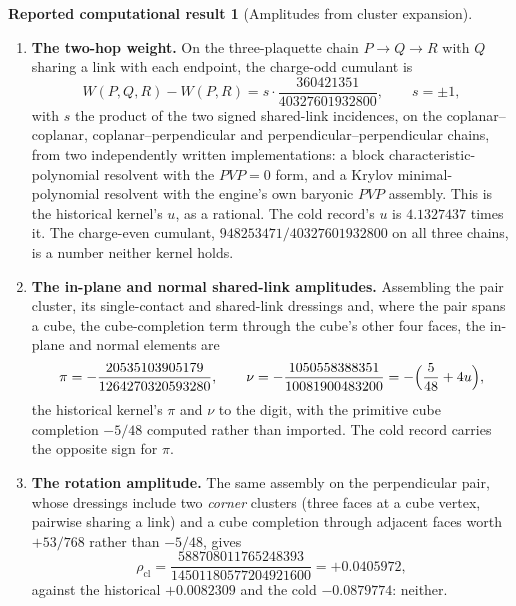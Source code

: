 \documentclass[11pt]{article}
\theoremstyle{plain}
\theoremstyle{definition}
\newtheorem{reported}[theorem]{Reported computational result}
\theoremstyle{remark}
\newcommand{\chk}[1]{}
\begin{document}
\begin{reported}[Amplitudes from cluster expansion]\label{rep:outside}
\begin{enumerate}\itemsep2pt
\item \textbf{The two-hop weight.} On the three-plaquette chain $P\to Q\to R$
  with $Q$ sharing a link with each endpoint, the charge-odd cumulant is
  \[
   W(P,Q,R)-W(P,R)=s\cdot\frac{360421351}{40327601932800},\qquad s=\pm1,
  \]
  with $s$ the product of the two signed shared-link incidences, on the
  coplanar--coplanar, coplanar--perpendicular and
  perpendicular--perpendicular chains, from two independently written
  implementations: a block characteristic-polynomial resolvent with the
  $PVP=0$ form, and a Krylov minimal-polynomial resolvent with the engine's
  own baryonic $PVP$ assembly. This is the historical kernel's $u$, as a
  rational. The cold record's $u$ is $4.1327437$ times it. The charge-even
  cumulant, $948253471/40327601932800$ on all three chains, is a number
  neither kernel holds.
\item \textbf{The in-plane and normal shared-link amplitudes.} Assembling
  the pair cluster, its single-contact and shared-link dressings and, where
  the pair spans a cube, the cube-completion term through the cube's other
  four faces, the in-plane and normal elements are
  \[
   \pi=-\frac{20535103905179}{1264270320593280},\qquad
   \nu=-\frac{1050558388351}{10081900483200}=-\Bigl(\frac5{48}+4u\Bigr),
  \]
  the historical kernel's $\pi$ and $\nu$ to the digit, with the primitive
  cube completion $-5/48$ computed rather than imported. The cold record
  carries the opposite sign for $\pi$.
\item \textbf{The rotation amplitude.} The same assembly on the
  perpendicular pair, whose dressings include two \emph{corner} clusters
  (three faces at a cube vertex, pairwise sharing a link) and a cube
  completion through adjacent faces worth $+53/768$ rather than $-5/48$, gives
  \[
   \rho_{\mathrm{cl}}=\frac{588708011765248393}{14501180577204921600}
   =+0.0405972,
  \]
  against the historical $+0.0082309$ and the cold $-0.0879774$: neither.
\end{enumerate}
\end{reported}
\chk{FINDING: the chain amplitude is u = X\_QUANTUM exactly, on the coplanar and the bent chain; the cold kernel's 4.13 u is wrong}
\chk{REPLICATION: a second implementation, with the engine's PVP assembly and a Krylov resolvent, gives u = X\_QUANTUM on three chain types}
\chk{the cluster expansion is linked: a plaquette sharing no link with the pair contributes exactly zero}
\chk{the lattice fourth-order in-plane nearest-neighbour element, assembled from clusters, is the historical kernel's pi exactly}
\chk{the lattice fourth-order normal element, assembled from clusters with the cube-completion term, is the agreed nu = -5/48 - 4u exactly}
\chk{the corner cluster's cumulant agrees between two implementations of the resolvent}
\chk{FINDING: the lattice fourth-order rotation element, assembled from clusters, is neither kernel's rho}
\end{document}
